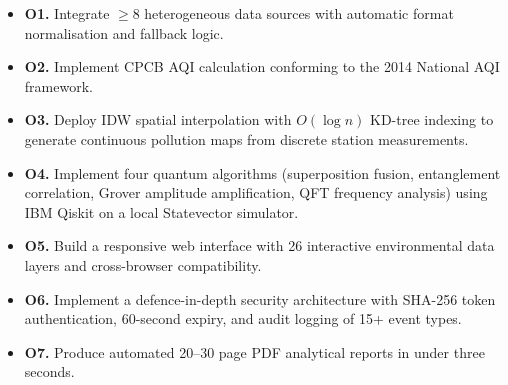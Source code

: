 \documentclass[12pt,a4paper]{article}
\begin{document}
\begin{itemize}[leftmargin=*]
\item \textbf{O1.} Integrate $\geq$8 heterogeneous data sources with automatic
      format normalisation and fallback logic.
\item \textbf{O2.} Implement CPCB AQI calculation conforming to the 2014
      National AQI framework.
\item \textbf{O3.} Deploy IDW spatial interpolation with $O(\log n)$ KD-tree
      indexing to generate continuous pollution maps from discrete station
      measurements.
\item \textbf{O4.} Implement four quantum algorithms (superposition fusion,
      entanglement correlation, Grover amplitude amplification, QFT frequency
      analysis) using IBM Qiskit on a local Statevector simulator.
\item \textbf{O5.} Build a responsive web interface with 26 interactive
      environmental data layers and cross-browser compatibility.
\item \textbf{O6.} Implement a defence-in-depth security architecture with
      SHA-256 token authentication, 60-second expiry, and audit logging of
      15+ event types.
\item \textbf{O7.} Produce automated 20--30 page PDF analytical reports in
      under three seconds.
\end{itemize}
\end{document}
